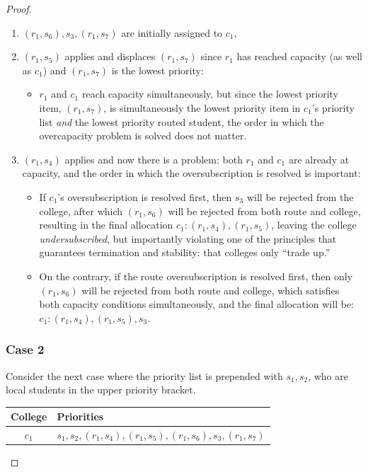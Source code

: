 \documentclass[runningheads]{llncs}
\begin{document}
\begin{proof}
    \begin{enumerate}
        \item $(r_1,s_6),s_3,(r_1,s_7)$ are initially assigned to $c_1$,
        \item $(r_1,s_5)$ applies and displaces $(r_1,s_7)$ since $r_1$ has reached capacity (as well as $c_1$) and $(r_1,s_7)$ is the lowest priority:
        \begin{itemize}
            \item $r_1$ and $c_1$ reach capacity simultaneously, but since the lowest priority item, $(r_1,s_7)$, is simultaneously the lowest priority item in $c_1$'s priority list \textit{and} the lowest priority routed student, the order in which the overcapacity problem is solved does not matter.
        \end{itemize}
        \item $(r_1,s_4)$ applies and now there is a problem: both $r_1$ and $c_1$ are already at capacity, and the order in which the oversubscription is resolved is important:
        \begin{itemize}
            \item If $c_1$'s oversubscription is resolved first, then $s_3$ will be rejected from the college, after which $(r_1,s_6)$ will be rejected from both route and college, resulting in the final allocation $c_1:(r_1,s_4),(r_1,s_5)$, leaving the college \textit{undersubscribed}, but importantly violating one of the principles that guarantees termination and stability: that colleges only \enquote{trade up.}
            \item On the contrary, if the route oversubscription is resolved first, then only $(r_1,s_6)$ will be rejected from both route and college, which satisfies both capacity conditions simultaneously, and the final allocation will be: $c_1:(r_1,s_4),(r_1,s_5),s_3$.
        \end{itemize}
    \end{enumerate}

    \subsubsection{Case 2}
    Consider the next case where the priority list is prepended with $s_1,s_2$, who are local students in the upper priority bracket.

    \begin{center}
        \begin{tabular}{ c|l }
            College&Priorities \\
            \hline
            $c_1$&$s_1,s_2,(r_1,s_4),(r_1,s_5),(r_1,s_6),s_3,(r_1,s_7)$ \\
    \end{tabular}
    \end{center}


\end{proof}
\end{document}

